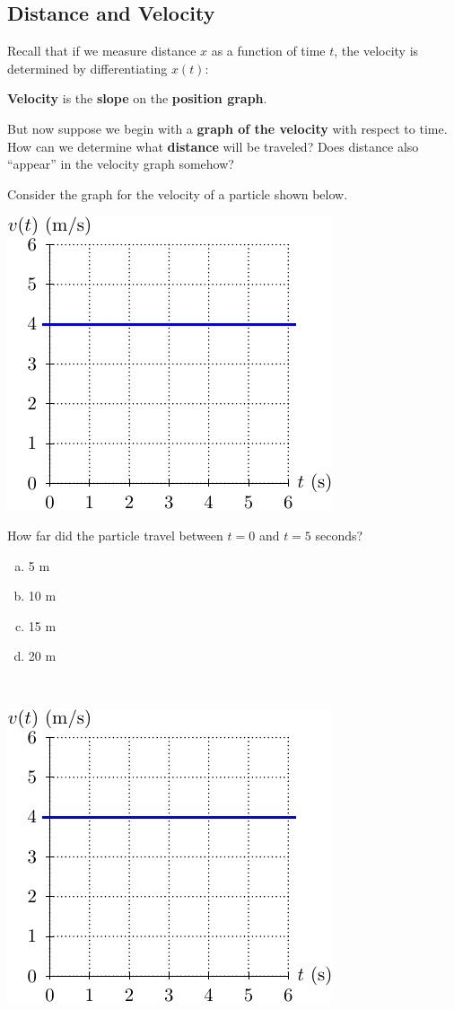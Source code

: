 \newpage


 \subsection*{Distance and Velocity}

 Recall that if we measure distance $x$ as a function of time $t$, the
 velocity is determined by differentiating $x(t)$: 
 \begin{center}
{\bf Velocity} is the {\bf slope} on the {\bf position graph}.
 \end{center}

 But now suppose we begin with a {\bf graph of the velocity} with
 respect to time.  How can we determine what {\bf distance} will be
 traveled?  Does distance also ``appear'' in the velocity graph
 somehow?

\newpage

\problem 
 Consider the graph for the velocity of a particle shown below. 
\begin{center}
\includegraphics[width=0.25\linewidth]{graphics/notes_04_const_velocity}
\end{center}
How far did the particle travel between $t=0$ and $t=5$ seconds?
\begin{enumerate}[(a)]
\item 5 m\\[1ex]
\item 10 m\\[1ex]
\item 15 m\\[1ex]
\item 20 m
\end{enumerate}

\newpage
\problem 
~
\begin{center}
\includegraphics[width=0.25\linewidth]{graphics/notes_04_const_velocity}
\end{center}

